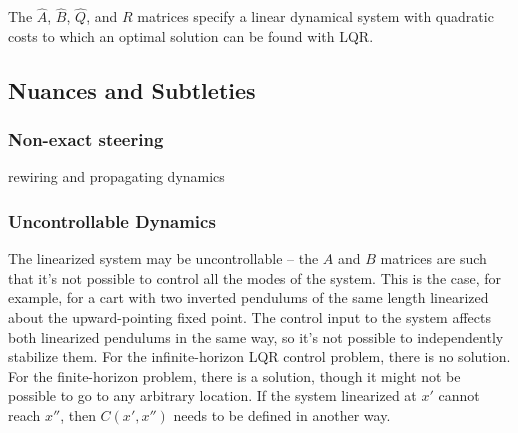 \documentclass[letterpaper, 10pt, english, conference]{IEEEtran}
\begin{document}
\begin{comment}
$\left(\begin{matrix}x\\
1
\end{matrix}\right)^{T}\left(\begin{matrix}Q & q\\
q^{T} & \eta_{1}
\end{matrix}\right)\left(\begin{matrix}x\\
1
\end{matrix}\right)=\left(\begin{matrix}x\\
1
\end{matrix}\right)^{T}\left(\begin{matrix}Qx+q\\
q^{T}x+\eta_{1}
\end{matrix}\right)=x^{T}Qx+x^{T}q+q^{T}x+d$
\end{comment}


The $\hat{A}$, $\hat{B}$, $\hat{Q}$, and $R$ matrices specify
a linear dynamical system with quadratic costs to which an optimal
solution can be found with LQR. 


\subsection{Nuances and Subtleties}


\subsubsection{Non-exact steering}

rewiring and propagating dynamics


\subsubsection{Uncontrollable Dynamics}

The linearized system may be uncontrollable -- the $A$ and $B$ matrices
are such that it's not possible to control all the modes of the system.
This is the case, for example, for a cart with two inverted pendulums
of the same length linearized about the upward-pointing fixed point.
The control input to the system affects both linearized pendulums
in the same way, so it's not possible to independently stabilize them.
For the infinite-horizon LQR control problem, there is no solution.
For the finite-horizon problem, there is a solution, though it might
not be possible to go to any arbitrary location. If the system linearized
at $x'$ cannot reach $x''$, then $C\left(x',x''\right)$ needs to
be defined in another way.
\end{document}
